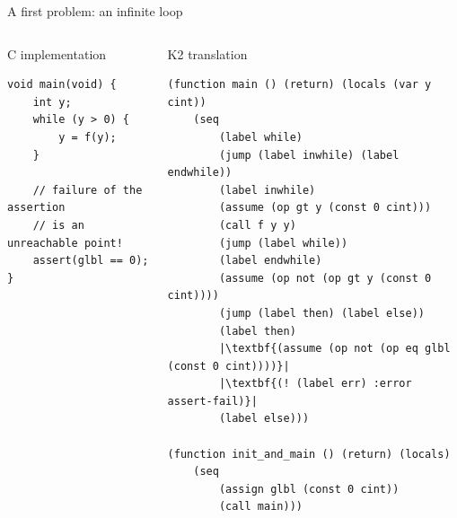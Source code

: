 \documentclass[aspectratio=1610,10.5pt]{beamer} %
\begin{document}
\begin{frame}[fragile]{A first problem: an infinite loop}
    \begin{columns}
        \begin{column}{0.35\textwidth}
            \begin{block}{C implementation}
                    \begin{verbatim}
void main(void) {
    int y;
    while (y > 0) {
        y = f(y);
    }

    // failure of the assertion
    // is an unreachable point!
    assert(glbl == 0);
}
                    \end{verbatim}
            \end{block}
        \end{column}
        \begin{column}{0.60\textwidth}
            \begin{block}{K2 translation}
                    \begin{verbatim}
(function main () (return) (locals (var y cint))
    (seq
        (label while)
        (jump (label inwhile) (label endwhile))
        (label inwhile)
        (assume (op gt y (const 0 cint)))
        (call f y y)
        (jump (label while))
        (label endwhile)
        (assume (op not (op gt y (const 0 cint))))
        (jump (label then) (label else))
        (label then)
        |\textbf{(assume (op not (op eq glbl (const 0 cint))))}|
        |\textbf{(! (label err) :error assert-fail)}|
        (label else)))

(function init_and_main () (return) (locals)
    (seq
        (assign glbl (const 0 cint))
        (call main)))
                    \end{verbatim}
            \end{block}
        \end{column}
    \end{columns}
\end{frame}
\end{document}
